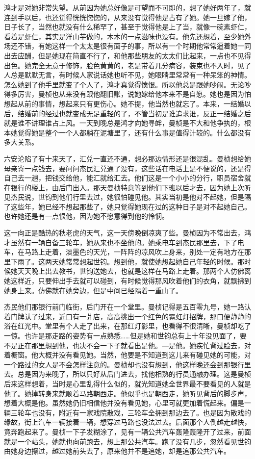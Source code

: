 \par 鸿才是对她非常失望。从前因为她总好像是可望而不可即的，想了她好两年了，就连到手以后，也还觉得恍恍惚惚的，从来没有觉得他是占有了她。她一旦嫁了他，日子长了，当然也就没有什么稀罕了，甚至于觉得他是上了当，就像一碗素虾仁，看着是虾仁，其实是洋山芋做的，木木的一点滋味也没有。他先还想着，至少她外场还不错，有她这样一个太太是很有面子的事，所以有一个时期他常常逼着她一同出去应酬，但是她现在简直不行了，和他那些朋友的太太们比起来，一点也不见得出色。她完全无意于修饰，脸色黄黄的，老是带着几分病容，装束也不入时，见了人总是默默无言，有时候人家说话她也听不见，她眼睛里常常有一种呆笨的神情。怎么她到了他手里就变了个人了，鸿才真觉得愤恨。所以他总是跟她吵闹。无论吵得多厉害，曼桢也从来没有跟他翻旧账，说她嫁给他本来不是自愿。她也是因为怕想起从前的事情，想起来只有更伤心。她不提，他当然也就忘了。本来，一结婚以后，结婚前的经过也就变成无足重轻的了，不管当初是谁追求谁，反正一结婚之后就是谁不讲理谁占上风。一天到晚总是鸿才向她寻衅，曼桢是不大和他争执的，根本她觉得她是整个一个人都躺在泥塘里了，还有什么事是值得计较的。什么都没有多大关系。
\par 六安沦陷了有十来天了，汇兑一直还不通，想必那边情形还是很混乱。曼桢想给她母亲寄一点钱去，要问问杰民汇兑通了没有，这些话在电话上是不便说的，还是得自己去一趟，把钱交给他，能汇就给汇去。他们这是一个小小的分行，职员宿舍就在银行的楼上，由后门出入。那天曼桢特意等到他们下班以后才去，因为她上次听见杰民说，世钧到他们行里去过，她很怕碰见他。其实当初是他对不起她，但是隔了这些年，她已经不想起那些了，她只觉得她现在过的这种日子是对不起她自己。也许她还是有一点恨他，因为她不愿意得到他的怜悯。
\par 这一向正是酷热的秋老虎的天气，这一天傍晚倒凉爽了些。曼桢因为不常出去，鸿才虽然有一辆自备三轮车，她从来也不坐他的。她乘电车到杰民那里去，下了电车，在马路上走着，淡墨色的天光，一阵阵的凉风吹上身来，别处一定有地方在那里下雨了。这两天她常常想起世钧。想到他，就使她想起她自己年轻的时候。那时候她天天晚上出去教书，世钧送她去，也就是这样在马路上走着。那两个人仿佛离她这样近，只要伸出手去就可以碰到，有时候觉得那风吹着他们的衣角，就飘拂到她身上来。仿佛就在她旁边，但是中间已经隔着一重山了。
\par 杰民他们那银行前门临街，后门开在一个堂里。曼桢记得是五百零九号，她一路认着门牌认了过来，近口有一爿店，高高挑出一个红色的霓虹灯招牌，那口便静静的浴在红光中。堂里有个人走了出来，在那红灯影里，也看得不很清晰，曼桢却吃了一惊。也许是那走路的姿势有一点熟悉……但是她和世钧总有上十年没见面了，要不是正在那里想到他，也决不会一下子就看出是他。—是他。她疾忙背过脸去，对着橱窗。他大概并没有看见她。当然，他要是不知道到这儿来有碰见她的可能，对一个路过的女人是不会怎样注意的。曼桢却也没有想到，他这样晚还会到那银行里去。总是因为来晚了，所以只好从后门进去，找他相熟的行员通融办理。这是曼桢后来这样想着，当时是心里乱得什么似的，就光知道她全世界最不要看见的人就是他了。她掉转身来就顺着马路朝西走。他似乎也是朝西走，她听见背后的脚步声，想着大概是他。虽然她仍旧相信他并没有看见她，心里可就更加着慌起来。偏是一辆三轮车也没有，附近有一家戏院散戏，三轮车全拥到那边去了。也是因为散戏的缘故，街上汽车一辆接着一辆，想穿过马路也没法过去。后面那个人倒越走越快，竟奔跑起来了。曼桢一下子发糊涂了，见有一辆公共汽车轰隆轰隆开了过来，前面就是一个站头，她就也向前跑去，想上那公共汽车。跑了没有几步，忽然看见世钧由她身边擦过，越过她前头去了，原来他并不是追她，却是追那公共汽车。
